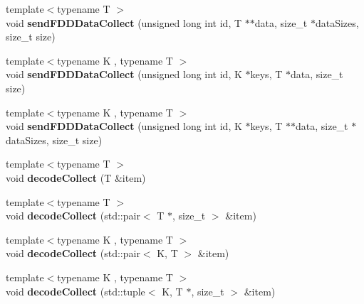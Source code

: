 \begin{DoxyCompactItemize}
\item 
\hypertarget{classfaster_1_1fastComm_acba48eca1ae4a1934dfdd80652c98cf6}{}\label{classfaster_1_1fastComm_acba48eca1ae4a1934dfdd80652c98cf6} 
{\footnotesize template$<$typename T $>$ }\\void {\bfseries send\+F\+D\+D\+Data\+Collect} (unsigned long int id, T $\ast$$\ast$data, size\+\_\+t $\ast$data\+Sizes, size\+\_\+t size)
\item 
\hypertarget{classfaster_1_1fastComm_ad2e48d9672f566a92d8dcb4222682883}{}\label{classfaster_1_1fastComm_ad2e48d9672f566a92d8dcb4222682883} 
{\footnotesize template$<$typename K , typename T $>$ }\\void {\bfseries send\+F\+D\+D\+Data\+Collect} (unsigned long int id, K $\ast$keys, T $\ast$data, size\+\_\+t size)
\item 
\hypertarget{classfaster_1_1fastComm_a563c5313ec49a2922ea25dc851e75071}{}\label{classfaster_1_1fastComm_a563c5313ec49a2922ea25dc851e75071} 
{\footnotesize template$<$typename K , typename T $>$ }\\void {\bfseries send\+F\+D\+D\+Data\+Collect} (unsigned long int id, K $\ast$keys, T $\ast$$\ast$data, size\+\_\+t $\ast$data\+Sizes, size\+\_\+t size)
\item 
\hypertarget{classfaster_1_1fastComm_abbd762b33b892abad86f8f041c4e8b9b}{}\label{classfaster_1_1fastComm_abbd762b33b892abad86f8f041c4e8b9b} 
{\footnotesize template$<$typename T $>$ }\\void {\bfseries decode\+Collect} (T \&item)
\item 
\hypertarget{classfaster_1_1fastComm_a9ee260039066dc7cd1f89883cf79dd57}{}\label{classfaster_1_1fastComm_a9ee260039066dc7cd1f89883cf79dd57} 
{\footnotesize template$<$typename T $>$ }\\void {\bfseries decode\+Collect} (std\+::pair$<$ T $\ast$, size\+\_\+t $>$ \&item)
\item 
\hypertarget{classfaster_1_1fastComm_acec19dd57de4e3a802a665712afd671b}{}\label{classfaster_1_1fastComm_acec19dd57de4e3a802a665712afd671b} 
{\footnotesize template$<$typename K , typename T $>$ }\\void {\bfseries decode\+Collect} (std\+::pair$<$ K, T $>$ \&item)
\item 
\hypertarget{classfaster_1_1fastComm_a3a5241970fed0e747bdbcdd3a78981d5}{}\label{classfaster_1_1fastComm_a3a5241970fed0e747bdbcdd3a78981d5} 
{\footnotesize template$<$typename K , typename T $>$ }\\void {\bfseries decode\+Collect} (std\+::tuple$<$ K, T $\ast$, size\+\_\+t $>$ \&item)

\end{DoxyCompactItemize}
